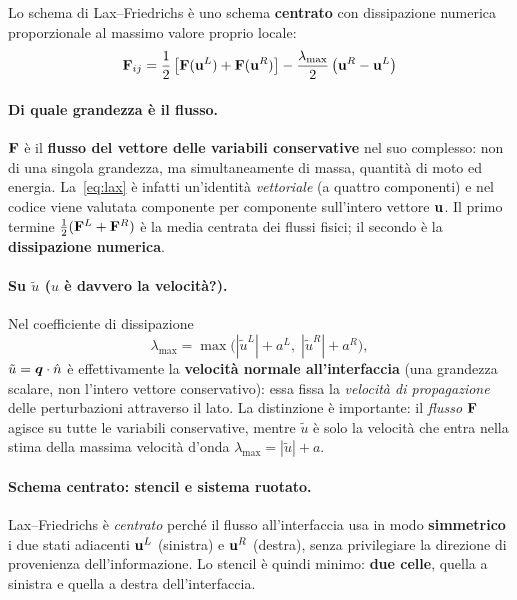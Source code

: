 Lo schema di Lax--Friedrichs è uno schema \textbf{centrato} con dissipazione numerica
proporzionale al massimo valore proprio locale:
\begin{equation}
  \mathbf{F}_{ij} = \frac{1}{2}\left[\mathbf{F}(\mathbf{u}^L) + \mathbf{F}(\mathbf{u}^R)\right]
               - \frac{\lambda_{\max}}{2}\left(\mathbf{u}^R - \mathbf{u}^L\right)
  \label{eq:lax}
\end{equation}

\paragraph{Di quale grandezza è il flusso.}
$\mathbf{F}$ è il \textbf{flusso del vettore delle variabili conservative} nel suo
complesso: non di una singola grandezza, ma simultaneamente di massa, quantità di moto
ed energia. La~\eqref{eq:lax} è infatti un'identità \emph{vettoriale} (a quattro
componenti) e nel codice viene valutata componente per componente sull'intero vettore
$\mathbf{u}$. Il primo termine $\tfrac12(\mathbf{F}^L+\mathbf{F}^R)$ è la media centrata dei flussi
fisici; il secondo è la \textbf{dissipazione numerica}.

\paragraph{Su $\tilde u$ ($u$ è davvero la velocità?).}
Nel coefficiente di dissipazione
\begin{equation*}
  \lambda_{\max} = \max\!\big(|\tilde{u}^L|+a^L,\; |\tilde{u}^R|+a^R\big),
\end{equation*}
$\tilde u = \bm{q}\cdot\hat{n}$ è effettivamente la \textbf{velocità normale
all'interfaccia} (una grandezza scalare, non l'intero vettore conservativo): essa
fissa la \emph{velocità di propagazione} delle perturbazioni attraverso il lato. La
distinzione è importante: il \emph{flusso} $\mathbf{F}$ agisce su tutte le variabili
conservative, mentre $\tilde u$ è solo la velocità che entra nella stima della
massima velocità d'onda $\lambda_{\max}=|\tilde u|+a$.

\paragraph{Schema centrato: stencil e sistema ruotato.}
Lax--Friedrichs è \emph{centrato} perché il flusso all'interfaccia usa in modo
\textbf{simmetrico} i due stati adiacenti $\mathbf{u}^L$ (sinistra) e $\mathbf{u}^R$ (destra),
senza privilegiare la direzione di provenienza dell'informazione. Lo stencil è quindi
minimo: \textbf{due celle}, quella a sinistra e quella a destra dell'interfaccia.


